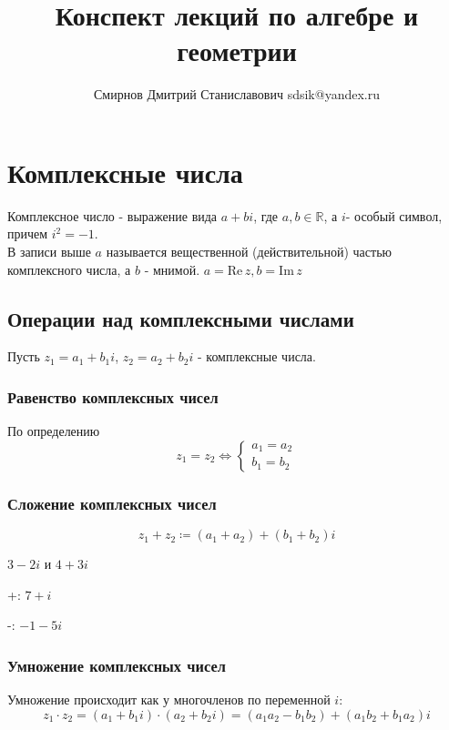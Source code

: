 \documentclass[12pt, a4paper]{article}
\title{Конспект лекций по алгебре и геометрии}
\author{Смирнов Дмитрий Станиславович sdsik@yandex.ru}
\date{}
\begin{document}
    \maketitle
    \tableofcontents
    \section{Комплексные числа}

    \begin{definition}
        Комплексное число - выражение вида \( a + bi \), где \( a, b \in \mathbb{R} \), а \( i \)- особый символ, причем \( i^2 = -1 \).\\
        В записи выше \(  a\) называется вещественной (действительной) частью комплексного числа, а \( b \) - мнимой. \( a = \mathrm{Re}\,z, b = \mathrm{Im}\, z \)
    \end{definition}
    \subsection{Операции над комплексными числами}
    Пусть \( z_{1} = a_{1} + b_{1}i \), \( z_{2} = a_{2} + b_{2}i \) - комплексные числа.
    \subsubsection{Равенство комплексных чисел}
    По определению 
    \[
        z_{1} = z_{2} \iff
    \begin{cases}
        a_{1} = a_{2} \\
        b_{1} = b_{2}
    \end{cases}
    \] 
    \subsubsection{Сложение комплексных чисел}
    \[
        z_{1} + z_{2} \coloneqq (a_{1} + a_{2}) + (b_{1} + b_{2})i
    \] 

    \begin{exmp}
        \( 3 - 2i \) и \( 4 + 3i \)

        +: \( 7 + i \)

        -: \( -1 - 5i \)
    \end{exmp}

    \subsubsection{Умножение комплексных чисел}
    Умножение происходит как у многочленов по переменной \( i \):
    \[
        z_{1} \cdot z_{2} = (a_{1} + b_{1}i) \cdot (a_{2} + b_{2}i)= (a_{1}a_{2} - b_{1}b_{2}) + (a_{1}b_{2} + b_{1}a_{2})i
    \] 
    
\end{document}
